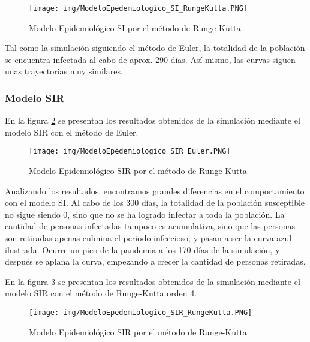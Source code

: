 \documentclass[a4paper,12pt]{article}
\begin{document}
\begin{figure}[ht!]
\centering
\texttt{[image: img/ModeloEpedemiologico\_SI\_RungeKutta.PNG]}
\vspace{-1em}
\caption{Modelo Epidemiológico SI por el método de Runge-Kutta}
\label{fig:si_rk4}
\end{figure}  \par

Tal como la simulación siguiendo el método de Euler, la totalidad de la población se encuentra infectada al cabo de aprox. 290 días. Así mismo, las curvas siguen unas trayectorias muy similares. \par

\subsubsection{Modelo SIR}

En la figura \ref{fig:sir_euler} se presentan los resultados obtenidos de la simulación mediante el modelo SIR con el método de Euler.

\begin{figure}[ht!]
\centering
\texttt{[image: img/ModeloEpedemiologico\_SIR\_Euler.PNG]}
\vspace{-1em}
\caption{Modelo Epidemiológico SIR por el método de Runge-Kutta}
\label{fig:sir_euler}
\end{figure}  \par

\newpage 

Analizando los resultados, encontramos grandes diferencias en el comportamiento con el modelo SI. Al cabo de los 300 días, la totalidad de la población susceptible no sigue siendo 0, sino que no se ha logrado infectar a toda la población. La cantidad de personas infectadas tampoco es acumulativa, sino que las personas son retiradas apenas culmina el periodo infeccioso, y pasan a ser la curva azul ilustrada. Ocurre un pico de la pandemia a los 170 días de la simulación, y después se aplana la curva, empezando a crecer la cantidad de personas retiradas. \par

En la figura \ref{fig:sir_rk4} se presentan los resultados obtenidos de la simulación mediante el modelo SIR con el método de Runge-Kutta orden 4.

\begin{figure}[ht!]
\centering
\texttt{[image: img/ModeloEpedemiologico\_SIR\_RungeKutta.PNG]}
\vspace{-1em}
\caption{Modelo Epidemiológico SIR por el método de Runge-Kutta}
\label{fig:sir_rk4}
\end{figure}  \par
\end{document}
